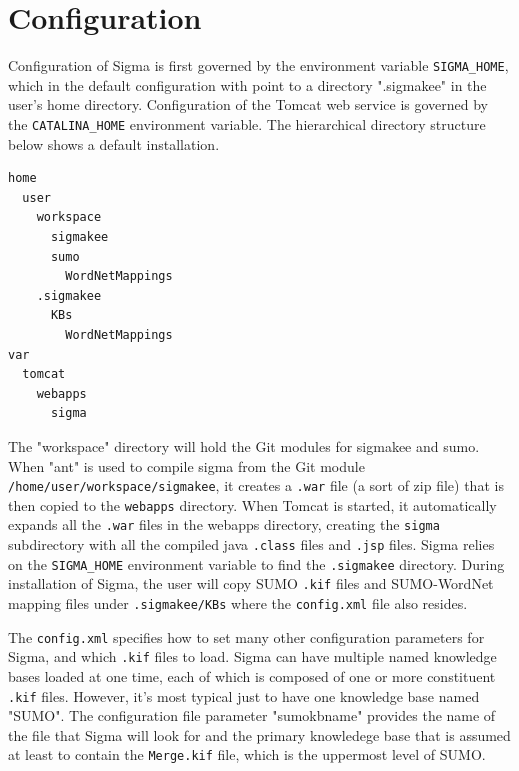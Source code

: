 \documentclass{book}
\begin{document}

\section{Configuration}
\label{chap:KnowRepr:sec:Conf}

Configuration of Sigma is first governed by the environment variable \texttt{SIGMA\_HOME},
which in the default configuration with point to a directory ".sigmakee" in the
user's home directory. Configuration of the Tomcat web service is governed by
the \texttt{CATALINA\_HOME} environment variable.
  The hierarchical directory structure below shows a default installation.

\begin{verbatim}
home
  user
    workspace
      sigmakee
      sumo
        WordNetMappings
    .sigmakee
      KBs
        WordNetMappings
var
  tomcat
    webapps
      sigma
\end{verbatim}

\begin{sloppypar}
The "workspace" directory will hold the Git modules for sigmakee and sumo. When
"ant" is used to compile sigma from the Git module
\texttt{/home/user/workspace/sigmakee}, it creates a \texttt{.war} file (a sort
of zip file) that is then copied to the \texttt{webapps} directory. When Tomcat
is started, it automatically expands all the \texttt{.war} files in the webapps
directory, creating the \texttt{sigma} subdirectory with all the compiled java
\texttt{.class} files and \texttt{.jsp} files.  Sigma relies on the
\texttt{SIGMA\_HOME} environment variable to find the \texttt{.sigmakee}
directory. During installation of Sigma, the user will copy SUMO \texttt{.kif}
files and SUMO-WordNet mapping files under \texttt{.sigmakee/KBs} where the
\texttt{config.xml} file also resides.
\end{sloppypar}

The \texttt{config.xml} specifies how to set many other configuration parameters
for Sigma, and which \texttt{.kif} files to load.  Sigma can have multiple named
knowledge bases loaded at one time, each of which is composed of one or more
constituent \texttt{.kif} files.  However, it's most typical just to have one
knowledge base named "SUMO".  The configuration file parameter "sumokbname" provides
the name of the file that Sigma will look for and the primary knowledege base that
is assumed at least to contain the \texttt{Merge.kif} file, which is the uppermost
level of SUMO.
\end{document}
